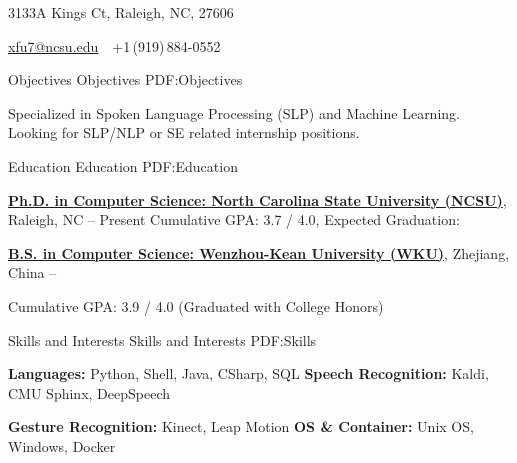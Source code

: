 \documentclass[letterpaper,MMMyyyy,nonstopmode]{simpleresumecv}
\newcommand{\CVAuthor}{Xiaoting Fu}
\begin{document}
    
    
    \Title{\CVAuthor}
    
    \begin{SubTitle}
    {3133A Kings Ct, Raleigh, NC, 27606}
    \par
    \href{mailto:xfu7@ncsu.edu}
    {xfu7@ncsu.edu}
    \,\SubBulletSymbol\,
    +1\,(919)\,884-0552
    \
    \end{SubTitle}
    
    \begin{Body}
    
    \Section
    {Objectives}
    {Objectives}
    {PDF:Objectives}
    
    \Entry
    \BulletItem
    Specialized in Spoken Language Processing (SLP) and Machine Learning. 
    \BulletItem
    Looking for SLP/NLP or SE related internship positions.
    
    \Section
    {Education}
    {Education}
    {PDF:Education}
    
    \Entry
    \href{http://www.ncsu.edu}
    {\textbf{Ph.D. in \href{https://www.csc.ncsu.edu/}
    {Computer Science}: North Carolina State University (NCSU)}}, Raleigh, NC
    \hfill
     --
    Present
    \BulletItem
    Cumulative GPA: 3.7 / 4.0, Expected Graduation: 
    \BigGap
    
    \Entry
    \href{http://www.wku.edu.cn}
    {\textbf{B.S. in
    \href{http://www.cs.wku.edu.cn}
    {Computer Science}: Wenzhou-Kean University (WKU)}}, Zhejiang, China
    \hfill
     --
    
    \BulletItem
    Cumulative GPA: 3.9 / 4.0 (Graduated with College Honors)
    
    
    \Section
    {Skills and Interests}
    {Skills and Interests}
    {PDF:Skills}
    
    \Entry
    \textbf{Languages:} Python, Shell, Java, CSharp, SQL \hfill  \textbf{Speech Recognition:} Kaldi, CMU Sphinx, DeepSpeech
    
    \textbf{Gesture Recognition:} Kinect, Leap Motion \hfill \textbf{OS \& Container:}  Unix OS, Windows, Docker
    
    

\end{Body}
\end{document}

